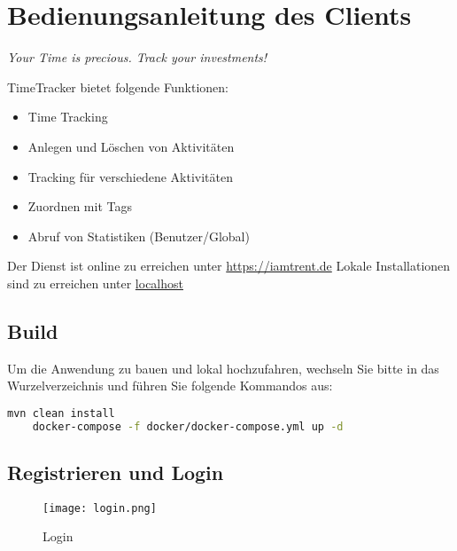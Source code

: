 
\section{Bedienungsanleitung des Clients}

\begin{center}
	\textit{Your Time is precious. \newline Track your investments!}
\end{center}


TimeTracker bietet folgende Funktionen:
\begin{itemize}
	\item Time Tracking
	\item Anlegen und Löschen von Aktivitäten %
	\item Tracking für verschiedene Aktivitäten
	\item Zuordnen mit Tags
	\item Abruf von Statistiken (Benutzer/Global)
\end{itemize}


Der Dienst ist online zu erreichen unter \url{https://iamtrent.de}
Lokale Installationen sind zu erreichen unter \url{localhost}

\subsection{Build}

Um die Anwendung zu bauen und lokal hochzufahren, wechseln Sie bitte in das Wurzelverzeichnis und führen Sie folgende Kommandos aus:
\begin{lstlisting}[language=bash]
	mvn clean install
	docker-compose -f docker/docker-compose.yml up -d
\end{lstlisting}

\subsection{Registrieren und Login }
 
 \begin{figure}[H]
 	\hspace{-1.5cm}
 	\texttt{[image: login.png]}
 	\caption{Login}
 	\label{fig:login}
 \end{figure}

